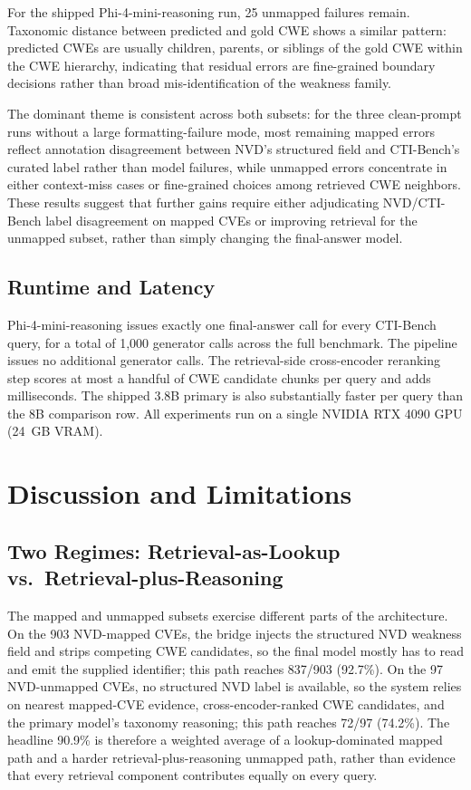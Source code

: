 For the shipped Phi-4-mini-reasoning run, 25 unmapped failures remain. Taxonomic distance between predicted and gold CWE shows a similar pattern: predicted CWEs are usually children, parents, or siblings of the gold CWE within the CWE hierarchy, indicating that residual errors are fine-grained boundary decisions rather than broad mis-identification of the weakness family.

The dominant theme is consistent across both subsets: for the three clean-prompt runs without a large formatting-failure mode, most remaining mapped errors reflect annotation disagreement between NVD's structured field and CTI-Bench's curated label rather than model failures, while unmapped errors concentrate in either context-miss cases or fine-grained choices among retrieved CWE neighbors. These results suggest that further gains require either adjudicating NVD/CTI-Bench label disagreement on mapped CVEs or improving retrieval for the unmapped subset, rather than simply changing the final-answer model.

\subsection{Runtime and Latency}
\label{sec:latency}

Phi-4-mini-reasoning issues exactly one final-answer call for every CTI-Bench query, for a total of 1{,}000 generator calls across the full benchmark. The pipeline issues no additional generator calls. The retrieval-side cross-encoder reranking step scores at most a handful of CWE candidate chunks per query and adds milliseconds. The shipped 3.8B primary is also substantially faster per query than the 8B comparison row. All experiments run on a single NVIDIA RTX 4090 GPU (24~GB VRAM).

\section{Discussion and Limitations}

\subsection{Two Regimes: Retrieval-as-Lookup vs.\ Retrieval-plus-Reasoning}

The mapped and unmapped subsets exercise different parts of the architecture. On the 903 NVD-mapped CVEs, the bridge injects the structured NVD weakness field and strips competing CWE candidates, so the final model mostly has to read and emit the supplied identifier; this path reaches 837/903 (92.7\%). On the 97 NVD-unmapped CVEs, no structured NVD label is available, so the system relies on nearest mapped-CVE evidence, cross-encoder-ranked CWE candidates, and the primary model's taxonomy reasoning; this path reaches 72/97 (74.2\%). The headline 90.9\% is therefore a weighted average of a lookup-dominated mapped path and a harder retrieval-plus-reasoning unmapped path, rather than evidence that every retrieval component contributes equally on every query.

